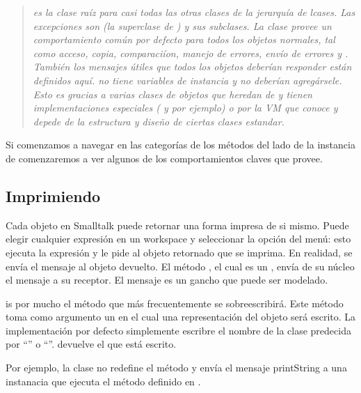 \documentclass[a4paper,10pt,twoside]{book}
\begin{document}
\begin{quote}
\textit{ es la clase ra\'iz para casi todas las otras clases de la jerarqu\'ia de lcases. Las excepciones son  (la superclase de  ) y sus subclases. 
La clase  provee un comportamiento com\'un por defecto para todos los objetos normales, tal como acceso, copia, comparaci\'ion, manejo de errores, env\'io de errores y . Tambi\'en los mensajes \'utiles que todos los objetos deber\'ian responder est\'an definidos aqu\'i.
 no tiene variables de instancia y no deber\'ian agreg\'arsele. Esto es gracias a varias clases de objetos que heredan de  y tienen implementaciones especiales ( y  por ejemplo) o por la VM que conoce y depede de la estructura y diseño de ciertas clases estandar.}
\end{quote}

Si comenzamos a navegar en las categor\'ias de los m\'etodos del lado de la instancia de  comenzaremos a ver algunos de los comportamientos claves que provee.

\subsection{Imprimiendo}

Cada objeto en Smalltalk puede retornar una forma impresa de si mismo. Puede elegir cualquier expresi\'on en un workspace y seleccionar la opci\'on  del men\'u: esto ejecuta la expresi\'on y le pide al objeto retornado que se imprima. En realidad, se env\'ia el mensaje  al objeto devuelto. El m\'etodo , el cual es un , env\'ia de su n\'ucleo el mensaje  a su receptor. El mensaje  es un gancho que puede ser modelado. 

 is por mucho el m\'etodo que m\'as frecuentemente se sobreescribir\'a. Este m\'etodo toma como argumento un  en el cual una representaci\'on  del objeto ser\'a escrito. La implementaci\'on por defecto simplemente escribre el nombre de la clase predecida por ``'' o ``''.  devuelve el  que est\'a escrito.

Por ejemplo, la clase  no redefine el m\'etodo  y env\'ia el mensaje printString a una instanacia que ejecuta el m\'etodo definido en  . 
\end{document}
